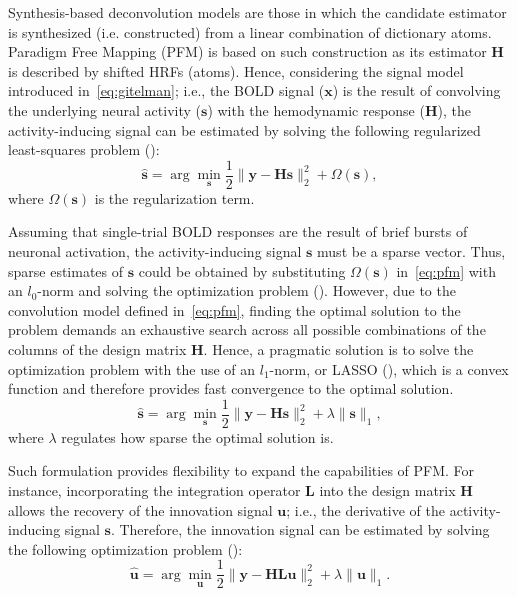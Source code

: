Synthesis-based deconvolution models are those in which the candidate estimator is synthesized (i.e. constructed) from a linear combination of dictionary atoms. Paradigm Free Mapping (PFM) is based on such construction as its estimator \(\mathbf{H}\) is described by shifted HRFs (atoms). Hence, considering the signal model introduced in~\eqref{eq:gitelman}; i.e., the BOLD signal (\(\mathbf{x}\)) is the result of convolving the underlying neural activity (\(\mathbf{s}\)) with the hemodynamic response (\(\mathbf{H}\)), the activity-inducing signal can be estimated by solving the following regularized least-squares problem (\citealt{gaudes2011DetectionCharacterizationSingletrial,caballerogaudes2013ParadigmFreeMapping,urunuela2020StabilityBasedSparseParadigm}):
\begin{equation}
    \label{eq:pfm}
    \hat{\mathbf{s}} = \arg \min_{\mathbf{s}} \frac{1}{2} \| \mathbf{y} - \mathbf{Hs} \|_2^2 + \Omega(\mathbf{s}),
\end{equation}
where \(\Omega(\mathbf{s})\) is the regularization term.

Assuming that single-trial BOLD responses are the result of brief bursts of neuronal activation, the activity-inducing signal \(\mathbf{s}\) must be a sparse vector. Thus, sparse estimates of \(\mathbf{s}\) could be obtained by substituting \(\Omega(\mathbf{s})\) in~\eqref{eq:pfm} with an \(l_0\)-norm and solving the optimization problem (\citealt{bruckstein2009SparseSolutionsSystems}). However, due to the convolution model defined in~\eqref{eq:pfm}, finding the optimal solution to the problem demands an exhaustive search across all possible combinations of the columns of the design matrix \(\mathbf{H}\). Hence, a pragmatic solution is to solve the optimization problem with the use of an \(l_1\)-norm, or LASSO (\citealt{tibshirani1996RegressionShrinkageSelection}), which is a convex function and therefore provides fast convergence to the optimal solution.
\begin{equation}
    \label{eq:pfm_spike}
    \hat{\mathbf{s}} = \arg \min_{\mathbf{s}} \frac{1}{2} \| \mathbf{y} - \mathbf{Hs} \|_2^2 + \lambda \| \mathbf{s} \|_1,
\end{equation}
where \(\lambda\) regulates how sparse the optimal solution is.

Such formulation provides flexibility to expand the capabilities of PFM. For instance, incorporating the integration operator \(\mathbf{L}\) into the design matrix \(\mathbf{H}\) allows the recovery of the innovation signal \(\mathbf{u}\); i.e., the derivative of the activity-inducing signal \(\mathbf{s}\). Therefore, the innovation signal can be estimated by solving the following optimization problem (\citealt{cherkaoui2019SparsitybasedBlindDeconvolution,urunuela2020StabilityBasedSparseParadigm}):
\begin{equation}
    \label{eq:pfm_block}
    \hat{\mathbf{u}} = \arg \min_{\mathbf{u}} \frac{1}{2} \| \mathbf{y} - \mathbf{HLu} \|_2^2 + \lambda \| \mathbf{u} \|_1.
\end{equation}

